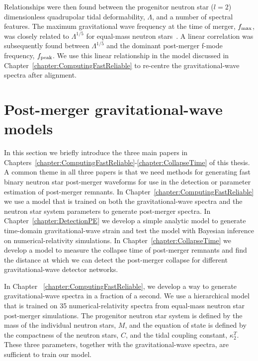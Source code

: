\documentclass[../Thesis.tex]{subfiles}
\begin{document}
    Relationships were then found between the progenitor neutron star ($l=2$) dimensionless quadrupolar tidal deformability, $\Lambda$, and a number of spectral features.
    The maximum gravitational wave frequency at the time of merger, $f_{\mathrm{max}}$, was closely related to $\Lambda^{1/5}$ for equal-mass neutron stars~\cite{Read2013}.
    A linear correlation was subsequently found between $\Lambda^{1/5}$ and the dominant post-merger f-mode frequency, $f_{\mathrm{peak}}$.
    We use this linear relationship in the model discussed in Chapter~\ref{chapter:ComputingFastReliable} to re-centre the gravitational-wave spectra after alignment.

    
    \section{Post-merger gravitational-wave models} 
    \label{sec:Intro:Models}
    In this section we briefly introduce the three main papers in Chapters~\ref{chapter:ComputingFastReliable}-\ref{chapter:CollapseTime} of this thesis. 
    A common theme in all three papers is that we need methods for generating fast binary neutron star post-merger waveforms for use in the detection or parameter estimation of post-merger remnants.
    In Chapter~\ref{chapter:ComputingFastReliable} we use a model that is trained on both the gravitational-wave spectra and the neutron star system parameters to generate post-merger spectra.
    In Chapter~\ref{chapter:DetectionPE} we develop a simple analytic model to generate time-domain gravitational-wave strain and test the model with Bayesian inference on numerical-relativity simulations.
    In Chapter~\ref{chapter:CollapseTime} we develop a model to measure the collapse time of post-merger remnants and find the distance at which we can detect the post-merger collapse for different gravitational-wave detector networks.
    
    In Chapter ~\ref{chapter:ComputingFastReliable}, we develop a way to generate gravitational-wave spectra in a fraction of a second.
    We use a hierarchical model that is trained on 35 numerical-relativity spectra from equal-mass neutron star post-merger simulations.
    The progenitor neutron star system is defined by the mass of the individual neutron stars, $M$, and the equation of state is defined by the compactness of the neutron stars, $C$, and the tidal coupling constant, $\kappa_2^T$.
    These three parameters, together with the gravitational-wave spectra, are sufficient to train our model. \par
    
\end{document}
